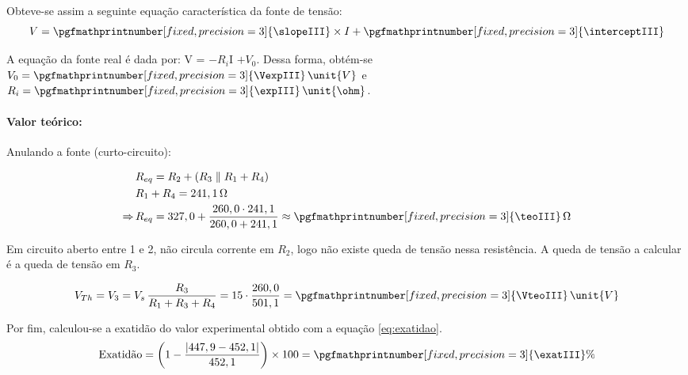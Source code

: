 Obteve-se assim a seguinte equação característica da fonte de tensão:
\begin{equation*}
	V = \pgfmathprintnumber[fixed, precision=3]{\slopeIII} \times I + \pgfmathprintnumber[fixed, precision=3]{\interceptIII}
	\label{eq:regLin3}
\end{equation*}

A equação da fonte real é dada por: V = $-R_i$I $+ V_0$. Dessa forma, obtém-se $V_0 = \pgfmathprintnumber[fixed, precision=3]{\VexpIII}\,\unit{V}$ e $R_i = \pgfmathprintnumber[fixed, precision=3]{\expIII}\,\unit{\ohm}$.


\paragraph{\textbf{Valor teórico:}}

\vspace{10pt}
Anulando a fonte (curto-circuito):

\begin{align*}
	               & R_{eq} = R_2 + (R_3 \parallel R_1 + R_4)                                                                                    \\
	               & R_1 + R_4 = 241,1 \, \Omega                                                                                                 \\
	\Rightarrow \, & R_{eq} = 327,0 + \frac{260,0 \cdot 241,1}{260,0 + 241,1} \approx \pgfmathprintnumber[fixed, precision=3]{\teoIII} \, \Omega
\end{align*}

Em circuito aberto entre 1 e 2, não circula corrente em $R_2$, logo não existe queda de tensão nessa resistência. A queda de tensão a calcular é a queda de tensão em $R_3$.

\begin{align*}
	V_{Th} = V_3 = V_s \, \frac{R_3}{R_1+R_3+R_4} = 15 \cdot \frac{260,0}{501,1} = \pgfmathprintnumber[fixed, precision=3]{\VteoIII}\,\unit{V}
\end{align*}

Por fim, calculou-se a exatidão do valor experimental obtido com a equação \eqref{eq:exatidao}.
\begin{equation*}
	\text{Exatidão} = \left(1 - \frac{|447,9 - 452,1|}{452,1}\right)\times 100 = \pgfmathprintnumber[fixed, precision=3]{\exatIII}\%
\end{equation*}
